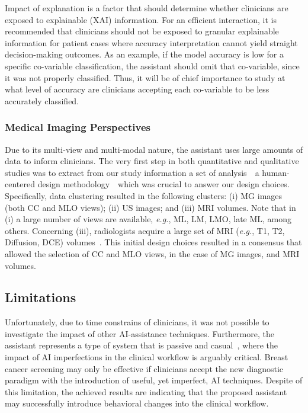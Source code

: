 Impact of explanation is a factor that should determine whether clinicians are exposed to explainable (XAI) information.
For an efficient interaction, it is recommended that clinicians should not be exposed to granular explainable information for patient cases where accuracy interpretation cannot yield straight decision-making outcomes.
As an example, if the model accuracy is low for a specific co-variable classification, the assistant should omit that co-variable, since it was not properly classified.
Thus, it will be of chief importance to study at what level of accuracy are clinicians accepting each co-variable to be less accurately classified.

\subsubsection{Medical Imaging Perspectives}

Due to its multi-view and multi-modal nature, the assistant uses large amounts of data to inform clinicians.
The very first step in both quantitative and qualitative studies was to extract from our study information a set of analysis~\textendash~a human-centered design methodology~\textendash~which was crucial to answer our design choices.
Specifically, data clustering resulted in the following clusters:
(i) MG images (both CC and MLO views);
(ii) US images; and
(iii) MRI volumes.
Note that in (i) a large number of views are available, {\it e.g.}, ML, LM, LMO, late ML, among others.
Concerning (iii), radiologists acquire a large set of MRI ({\it e.g.}, T1, T2, Diffusion, DCE) volumes~\cite{seifabadi2019correlation}.
This initial design choices resulted in a consensus that allowed the selection of CC and MLO views, in the case of MG images, and MRI volumes.

\subsection{Limitations}

Unfortunately, due to time constrains of clinicians, it was not possible to investigate the impact of other AI-assistance techniques.
Furthermore, the assistant represents a type of system that is passive and casual~\cite{Kocielnik:2019:YAI:3290605.3300641}, where the impact of AI imperfections in the clinical workflow is arguably critical.
Breast cancer screening may only be effective if clinicians accept the new diagnostic paradigm with the introduction of useful, yet imperfect, AI techniques.
Despite of this limitation, the achieved results are indicating that the proposed assistant may successfully introduce behavioral changes into the clinical workflow.

